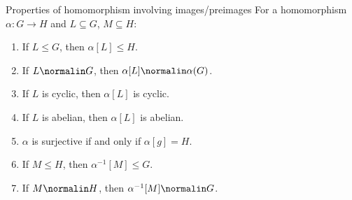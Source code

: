 \begin{thmbox}{Properties of homomorphism involving images/preimages}{}
    For a homomorphism $\alpha : G \to H$ and $L \subseteq G$, $M \subseteq H$:
    \begin{enumerate}
        \item If $L \leq G$, then $\alpha[L] \leq H$.
        \item If $L \normalin G$, then $\alpha[L] \normalin \alpha(G)$.
        \item If $L$ is cyclic, then $\alpha[L]$ is cyclic.
        \item If $L$ is abelian, then $\alpha[L]$ is abelian.
        \item $\alpha$ is surjective if and only if $\alpha[g] = H$.
        \item If $M \leq H$, then $\alpha^{-1}[M] \leq G$.
        \item If $M \normalin H$, then $\alpha^{-1}[M] \normalin G$.
    \end{enumerate}
\end{thmbox}

